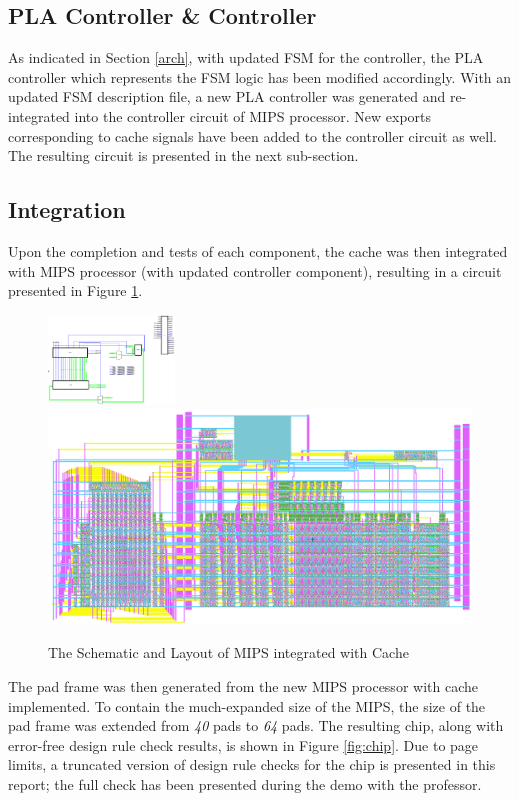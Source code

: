 \documentclass[conference]{IEEEtran}
\begin{document}
\subsection{PLA Controller \& Controller}\label{subsec:controller}
As indicated in Section \ref{arch}, with updated FSM for the controller, the PLA controller which represents the FSM logic has been modified accordingly. With an updated FSM description file, a new PLA controller was generated and re-integrated into the controller circuit of MIPS processor. New exports corresponding to cache signals have been added to the controller circuit as well. The resulting circuit is presented in the next sub-section.

\subsection{Integration}\label{subsec:integration}
Upon the completion and tests of each component, the cache was then integrated with MIPS processor (with updated controller component), resulting in a circuit presented in Figure \ref{fig:mips}.

\begin{figure}[h!]
  \centering
    \includegraphics[width=0.3\textwidth]{mips_sch} \includegraphics[scale=0.3]{mips_lay}
  \caption{The Schematic and Layout of MIPS integrated with Cache}
  \label{fig:mips}
\end{figure}

The pad frame was then generated from the new MIPS processor with cache implemented. To contain the much-expanded size of the MIPS, the size of the pad frame was extended from \textit{40} pads to \textit{64} pads. The resulting chip, along with error-free design rule check results, is shown in Figure \ref{fig:chip}. Due to page limits, a truncated version of design rule checks for the chip is presented in this report; the full check has been presented during the demo with the professor.
\end{document}
